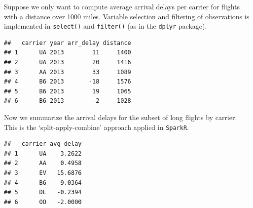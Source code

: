 \documentclass[
  12pt,
]{style/krantz}
\newenvironment{Shaded}{\begin{snugshade}}{\end{snugshade}}
\newcommand{\AttributeTok}[1]{\textcolor[rgb]{0.77,0.63,0.00}{#1}}
\newcommand{\CommentTok}[1]{\textcolor[rgb]{0.56,0.35,0.01}{\textit{#1}}}
\newcommand{\DecValTok}[1]{\textcolor[rgb]{0.00,0.00,0.81}{#1}}
\newcommand{\FunctionTok}[1]{\textcolor[rgb]{0.00,0.00,0.00}{#1}}
\newcommand{\NormalTok}[1]{#1}
\newcommand{\OtherTok}[1]{\textcolor[rgb]{0.56,0.35,0.01}{#1}}
\newcommand{\SpecialCharTok}[1]{\textcolor[rgb]{0.00,0.00,0.00}{#1}}
\newcommand{\StringTok}[1]{\textcolor[rgb]{0.31,0.60,0.02}{#1}}
\begin{document}
Suppose we only want to compute average arrival delays per carrier for flights with a distance over 1000 miles. Variable selection and filtering of observations is implemented in \texttt{select()} and \texttt{filter()} (as in the \texttt{dplyr} package).

\begin{Shaded}
\end{Shaded}

\begin{verbatim}
##   carrier year arr_delay distance
## 1      UA 2013        11     1400
## 2      UA 2013        20     1416
## 3      AA 2013        33     1089
## 4      B6 2013       -18     1576
## 5      B6 2013        19     1065
## 6      B6 2013        -2     1028
\end{verbatim}

Now we summarize the arrival delays for the subset of long flights by carrier. This is the `split-apply-combine' approach applied in \texttt{SparkR}.

\begin{Shaded}
\end{Shaded}

\begin{verbatim}
##   carrier avg_delay
## 1      UA    3.2622
## 2      AA    0.4958
## 3      EV   15.6876
## 4      B6    9.0364
## 5      DL   -0.2394
## 6      OO   -2.0000
\end{verbatim}
\end{document}
